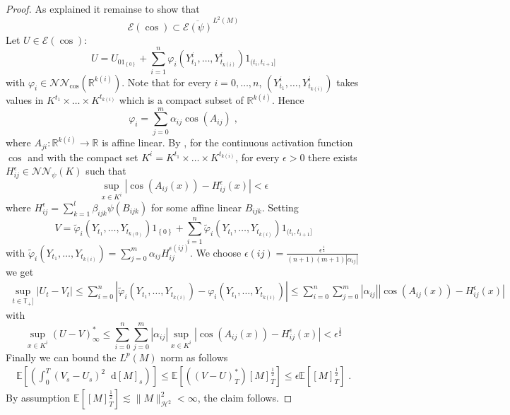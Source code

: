 \documentclass[11pt]{report}
\newcommand{\diff}{\mathop{}\!\mathrm{d}}
\theoremstyle{plain} %
\theoremstyle{definition} %
\theoremstyle{remark} %
\begin{document}
\begin{proof}
As explained it remainse to show that 
    \begin{equation}
    \mathcal{E}(\cos)\subset \overline{\mathcal{E}(\psi)}^{L^2(M)}
\end{equation}
Let \(U\in\mathcal{E}(\cos)\):
\begin{equation}
    U = U_01_{\left\{0\right\}}+\sum_{i=1}^n \varphi_i(Y_{t_1}^i,\dots,Y_{t_{k(i)}}^i)1_{(t_i,t_{i+1}]}
\end{equation}
with \(\varphi_i\in\mathcal{NN}_{\cos}(\mathbb{R}^{k(i)})\). Note that for every \(i=0,\dots,n\), \((Y_{t_1}^i,\dots,Y_{t_{k(i)}}^i)\) takes values in \(K^{t_1}\times\dots\times K^{t_{k(i)}}\) which is a compact subset of \(\mathbb{R}^{k(i)}\). Hence 
\begin{equation}
    \varphi_i=\sum_{j=0}^m\alpha_{ij}\cos(A_{ij})\;,
\end{equation}
where \(A_{ji}:\mathbb{R}^{k(i)}\to\mathbb{R}\) is affine linear. 
By \parencite[Thm.~2]{Hornik1991}, for the continuous activation function \(\cos\) and with the compact set \(K^i=K^{t_1}\times\dots\times K^{t_{k(i)}}\), for every \(\epsilon>0\) there exists \(H_{ij}^{\epsilon}\in\mathcal{NN}_{\psi}(K)\) such that 
\begin{equation}
    \sup_{x\in K^i}|\cos(A_{ij}(x))-H_{ij}^{\epsilon}(x)|<\epsilon
\end{equation}
where \(H_{ij}^{\epsilon}=\sum_{k=1}^l\beta_{ijk}\psi(B_{ijk})\) for some affine linear \(B_{ijk}\). Setting
\begin{equation}
    V = \widetilde{\varphi}_i(Y_{t_1},\dots,Y_{t_{k(0)}})1_{\left\{ 0\right\}}+\sum_{i=1}^n\widetilde{\varphi}_i(Y_{t_1},\dots,Y_{t_{k(i)}})1_{(t_i,t_{i+1}]}
\end{equation}
with \(\widetilde{\varphi}_i(Y_{t_1},\dots,Y_{t_{k(i)}})=\sum_{j=0}^m\alpha_{ij}H_{ij}^{\epsilon(ij)}\). We choose \(\epsilon(ij)=\frac{\epsilon^{\frac{1}{2}}}{(n+1)(m+1)|\alpha_{ij}|}\)
we get 
\begin{align*}
    \sup_{t\in\mathbb{T}_+]}|U_t-V_t|\leq \sum_{i=0}^{n}|\widetilde{\varphi}_i(Y_{t_1},\dots,Y_{t_{k(i)}})-\varphi_i(Y_{t_1},\dots,Y_{t_{k(i)}})|\leq \sum_{i=0}^{n}\sum_{j=0}^m|\alpha_{ij}||\cos(A_{ij}(x))-H_{ij}^{\epsilon}(x)|
\end{align*}
with
\begin{equation}
    \sup_{x\in K^i}(U-V)_{\infty}^*\leq \sum_{i=0}^{n}\sum_{j=0}^m|\alpha_{ij}|\sup_{x\in K^i}|\cos(A_{ij}(x))-H_{ij}^{\epsilon}(x)|< \epsilon^{\frac{1}{2}}
\end{equation}
Finally we can bound the \(L^p(M)\) norm as follows
\begin{align*}
    \mathbb{E}[\left(\int_{0}^{T}(V_s-U_s)^2\diff [M]_s\right)]\leq \mathbb{E}[((V-U)_{T}^*)[M]_{T}^{\frac{1}{2}}]\leq\epsilon\mathbb{E}[[M]_{T}^{\frac{1}{2}}]\;.
\end{align*}
By assumption \(\mathbb{E}[[M]_{T}^{\frac{1}{2}}]\lesssim\lVert M\rVert_{\mathcal{H}^2}^2<\infty\), the claim follows. 
\end{proof}
\end{document}
